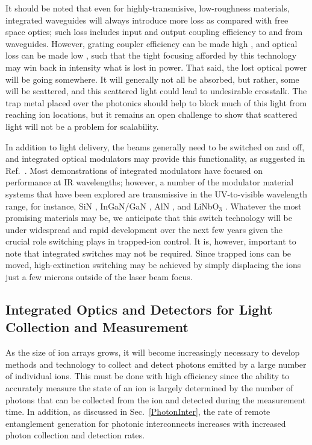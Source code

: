 \documentclass[%
12pt,
 amsmath,amssymb,
]{revtex4-2}
\begin{document}
It should be noted that even for highly-transmisive, low-roughness materials, integrated waveguides will always introduce more loss as compared with free space optics; such loss includes input and output coupling efficiency to and from waveguides.  However, grating coupler efficiency can be made high \cite{NotarosHighEffGratings2016, MehtaGrating2017}, and optical loss can be made low \cite{WestAl2O32018}, such that the tight focusing afforded by this technology may win back in intensity what is lost in power.  That said, the lost optical power will be going somewhere.  It will generally not all be absorbed, but rather, some will be scattered, and this scattered light could lead to undesirable crosstalk.  The trap metal placed over the photonics should help to block much of this light from reaching ion locations, but it remains an open challenge to show that scattered light will not be a problem for scalability.

In addition to light delivery, the beams generally need to be switched on and off, and integrated optical modulators may provide this functionality, as suggested in Ref.~\cite{KielpinskiIntPhotonArch2016}.  Most demonstrations of integrated modulators have focused on performance at IR wavelengths; however, a number of the modulator material systems that have been explored are transmissive in the UV-to-visible wavelength range, for instance, SiN \cite{YegnanarayananSiNModulators2018, MohantyBlueSiNModulators2018}, InGaN/GaN \cite{FengGaNmodulator2018}, AlN \cite{XiongAlN2012, ZhuAlNMod2016}, and LiNbO$_3$ \cite{MehtaLiNbO3VisMod2017, WangLoncarModulators2018, DesiatovVisLiNbO3Mod2019}.  Whatever the most promising materials may be, we anticipate that this switch technology will be under widespread and rapid development over the next few years given the crucial role switching plays in trapped-ion control.  It is, however, important to note that integrated switches may not be required.  Since trapped ions can be moved, high-extinction switching may be achieved by simply displacing the ions just a few microns outside of the laser beam focus.


\subsection{Integrated Optics and Detectors for Light Collection and Measurement}
As the size of ion arrays grows, it will become increasingly necessary to develop methods and technology to collect and detect photons emitted by a large number of individual ions.  This must be done with high efficiency since the ability to accurately measure the state of an ion is largely determined by the number of photons that can be collected from the ion and detected during the measurement time.  In addition, as discussed in Sec.~\ref{PhotonInter}, the rate of remote entanglement generation for photonic interconnects increases with increased photon collection and detection rates.
\end{document}
